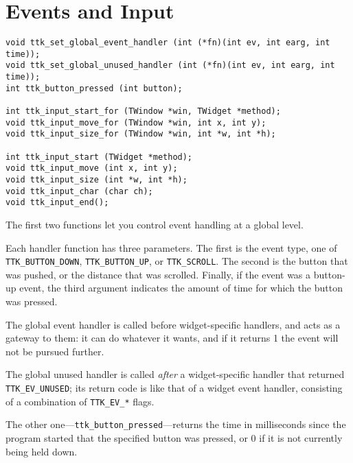 \documentclass[12pt,letterpaper]{report}
\begin{document}
\section{Events and Input}
\begin{verbatim}
void ttk_set_global_event_handler (int (*fn)(int ev, int earg, int time));
void ttk_set_global_unused_handler (int (*fn)(int ev, int earg, int time));
int ttk_button_pressed (int button);

int ttk_input_start_for (TWindow *win, TWidget *method);
void ttk_input_move_for (TWindow *win, int x, int y);
void ttk_input_size_for (TWindow *win, int *w, int *h);

int ttk_input_start (TWidget *method);
void ttk_input_move (int x, int y);
void ttk_input_size (int *w, int *h);
void ttk_input_char (char ch);
void ttk_input_end();
\end{verbatim}

The first two functions let you control event handling at a global level.

Each handler function has three parameters. The first is the event type, one of
\verb|TTK_BUTTON_DOWN|, \verb|TTK_BUTTON_UP|, or \verb|TTK_SCROLL|.
The second is the button that was pushed, or the distance that was scrolled.
Finally, if the event was a button-up event, the third argument indicates the
amount of time for which the button was pressed.

The global event handler is called before widget-specific handlers, and acts
as a gateway to them: it can do whatever it wants, and if it returns 1 the
event will not be pursued further.

The global unused handler is called \emph{after} a widget-specific handler that
returned \verb|TTK_EV_UNUSED|; its return code is like that of a widget event
handler, consisting of a combination of \verb|TTK_EV_*| flags.

The other one---\verb|ttk_button_pressed|---returns the time in milliseconds
since the program started that the specified button was pressed, or 0 if it
is not currently being held down.
\end{document}
